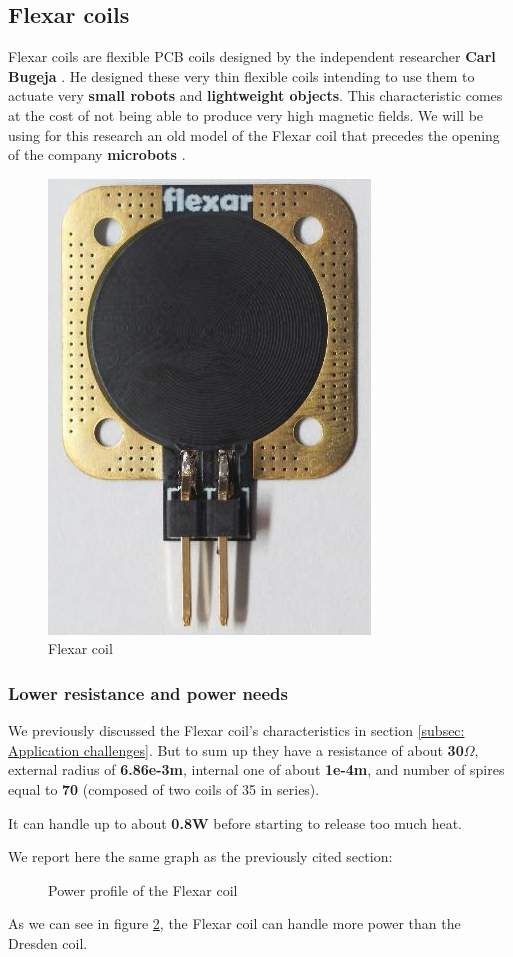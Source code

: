 \subsection{Flexar coils}
Flexar coils are flexible PCB coils designed by the independent researcher \textbf{Carl Bugeja} \cite{Carl_Bugeja}.
He designed these very thin flexible coils intending to use them to actuate very \textbf{small robots} and \textbf{lightweight objects}.
This characteristic comes at the cost of not being able to produce very high magnetic fields.
We will be using for this research an old model of the Flexar coil that precedes the opening of the company \textbf{microbots} \cite{microbots}.
\begin{figure}[H]
    \centering
    \includegraphics[width=0.4\linewidth]{Chapters/Chapter5/Coils_alternatives/Figures/Flexar_coil.png}
    \caption{Flexar coil }
    \label{fig:Flexar_coil}
\end{figure}


\subsubsection{Lower resistance and power needs}
We previously discussed the Flexar coil's characteristics in section \ref{subsec: Application challenges}.
But to sum up they have a resistance of about \textbf{30$\Omega$}, external radius of \textbf{6.86e-3m}, internal one of about \textbf{1e-4m}, and number of spires equal to \textbf{70} (composed of two coils of 35 in series).

\begin{samepage}
    It can handle up to about \textbf{0.8W} before starting to release too much heat.
    \nopagebreak

    We report here the same graph as the previously cited section:
    \nopagebreak

    \begin{figure}[H]
        \centering
        \resizebox{0.5\textwidth}{!}{
            
        }
        \caption{Power profile of the Flexar coil}
        \label{fig: Flexar_heat_graph}
    \end{figure}
    \nopagebreak

    As we can see in figure \ref{fig: Flexar_heat_graph}, the Flexar coil can handle more power than the Dresden coil.
\end{samepage}

